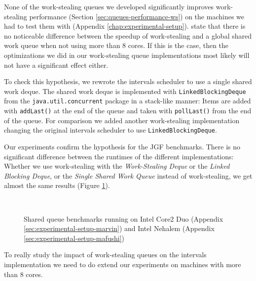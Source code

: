 None of the work-stealing queues we developed significantly improves
work-stealing performance (Section \ref{sec:queues-performance-ws}) on
the machines we had to test them with (Appendix
\ref{chap:experimental-setup}). \textcite{Saha2007} state that there
is no noticeable difference between the speedup of work-stealing and a
global shared work queue when not using more than 8 cores. If this is
the case, then the optimizations we did in our work-stealing queue
implementations most likely will not have a significant effect either.

To check this hypothesis, we rewrote the intervals scheduler to use a
single shared work deque. The shared work deque is implemented with
\lstinline!LinkedBlockingDeque! from the
\lstinline!java.util.concurrent! package in a stack-like manner: Items
are added with \lstinline!addLast()! at the end of the queue and taken
with \lstinline!pollLast()! from the end of the queue. For comparison
we added another work-stealing implementation changing the original
intervals scheduler to use \lstinline!LinkedBlockingDeque!.

Our experiments confirm the hypothesis for the JGF benchmarks. There
is no significant difference between the runtimes of the different
implementations: Whether we use work-stealing with the
\emph{Work-Stealing Deque} or the \emph{Linked Blocking Deque}, or the
\emph{Single Shared Work Queue} instead of work-stealing, we get
almost the same results (Figure
\ref{fig:queues-performance-shared-queue}).

\begin{figure}[!ht]
  \centering
  \\
  \caption[Single shared work queue benchmark results]{Shared queue
    benchmarks running on Intel Core2 Duo (Appendix
    \ref{sec:experimental-setup-marvin}) and Intel Nehalem (Appendix
    \ref{sec:experimental-setup-mafushi})}
  \label{fig:queues-performance-shared-queue}
\end{figure}

To really study the impact of work-stealing queues on the intervals
implementation we need to do extend our experiments on machines with
more than 8 cores.


